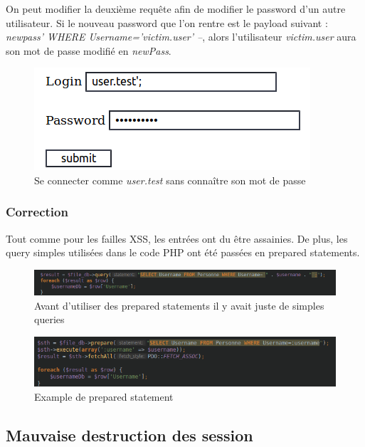 \documentclass[12pt]{article}
\begin{document}
On peut modifier la deuxième requête afin de modifier le password d'un autre utilisateur. Si le nouveau password que l'on rentre est le payload suivant : \textit{newpass' WHERE Username='victim.user' --}, alors l'utilisateur \textit{victim.user} aura son mot de passe modifié en \textit{newPass}.

\begin{figure}[H]
\centering
\includegraphics[width=\linewidth]{images/sqliLogin.png}
\caption{Se connecter comme \textit{user.test} sans connaître son mot de passe}
\end{figure}

\subsubsection{Correction}
Tout comme pour les failles XSS, les entrées ont du être assainies. De plus, les query simples utilisées dans le code PHP ont été passées en prepared statements.

\begin{figure}[H]
\centering
\includegraphics[width=\linewidth]{images/simpleQuery.png}
\caption{Avant d'utiliser des prepared statements il y avait juste de simples queries}
\end{figure}

\begin{figure}[H]
\centering
\includegraphics[width=\linewidth]{images/preparedStatement.png}
\caption{Example de prepared statement}
\end{figure}

\subsection{Mauvaise destruction des session}
\end{document}
